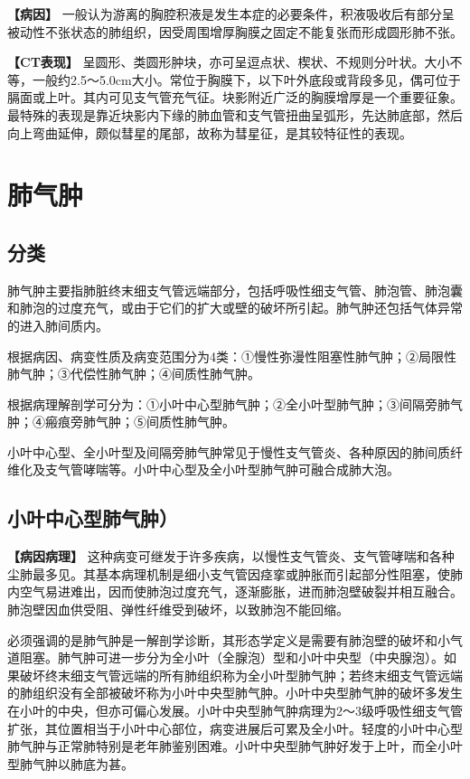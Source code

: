 \textbf{【病因】}
一般认为游离的胸腔积液是发生本症的必要条件，积液吸收后有部分呈被动性不张状态的肺组织，因受周围增厚胸膜之固定不能复张而形成圆形肺不张。

\textbf{【CT表现】}
呈圆形、类圆形肿块，亦可呈逗点状、楔状、不规则分叶状。大小不等，一般约2.5～5.0cm大小。常位于胸膜下，以下叶外底段或背段多见，偶可位于膈面或上叶。其内可见支气管充气征。块影附近广泛的胸膜增厚是一个重要征象。最特殊的表现是靠近块影内下缘的肺血管和支气管扭曲呈弧形，先达肺底部，然后向上弯曲延伸，颇似彗星的尾部，故称为彗星征，是其较特征性的表现。

\section{肺气肿}

\subsection{分类}

肺气肿主要指肺脏终末细支气管远端部分，包括呼吸性细支气管、肺泡管、肺泡囊和肺泡的过度充气，或由于它们的扩大或壁的破坏所引起。肺气肿还包括气体异常的进入肺间质内。

根据病因、病变性质及病变范围分为4类：①慢性弥漫性阻塞性肺气肿；②局限性肺气肿；③代偿性肺气肿；④间质性肺气肿。

根据病理解剖学可分为：①小叶中心型肺气肿；②全小叶型肺气肿；③间隔旁肺气肿；④瘢痕旁肺气肿；⑤间质性肺气肿。

小叶中心型、全小叶型及间隔旁肺气肿常见于慢性支气管炎、各种原因的肺间质纤维化及支气管哮喘等。小叶中心型及全小叶型肺气肿可融合成肺大泡。

\subsection{小叶中心型肺气肿）}

\textbf{【病因病理】}
这种病变可继发于许多疾病，以慢性支气管炎、支气管哮喘和各种尘肺最多见。其基本病理机制是细小支气管因痉挛或肿胀而引起部分性阻塞，使肺内空气易进难出，因而使肺泡过度充气，逐渐膨胀，进而肺泡壁破裂并相互融合。肺泡壁因血供受阻、弹性纤维受到破坏，以致肺泡不能回缩。

必须强调的是肺气肿是一解剖学诊断，其形态学定义是需要有肺泡壁的破坏和小气道阻塞。肺气肿可进一步分为全小叶（全腺泡）型和小叶中央型（中央腺泡）。如果破坏终末细支气管远端的所有肺组织称为全小叶型肺气肿；若终末细支气管远端的肺组织没有全部被破坏称为小叶中央型肺气肿。小叶中央型肺气肿的破坏多发生在小叶的中央，但亦可偏心发展。小叶中央型肺气肿病理为2～3级呼吸性细支气管扩张，其位置相当于小叶中心部位，病变进展后可累及全小叶。轻度的小叶中心型肺气肿与正常肺特别是老年肺鉴别困难。小叶中央型肺气肿好发于上叶，而全小叶型肺气肿以肺底为甚。

